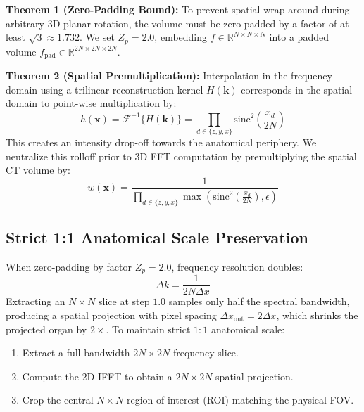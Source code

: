 \documentclass[journal,twocolumn]{IEEEtran}
\begin{document}
\textbf{Theorem 1 (Zero-Padding Bound):} To prevent spatial wrap-around during arbitrary 3D planar rotation, the volume must be zero-padded by a factor of at least $\sqrt{3} \approx 1.732$. We set $Z_p = 2.0$, embedding $f \in \mathbb{R}^{N \times N \times N}$ into a padded volume $f_{\mathrm{pad}} \in \mathbb{R}^{2N \times 2N \times 2N}$.

\textbf{Theorem 2 (Spatial Premultiplication):} Interpolation in the frequency domain using a trilinear reconstruction kernel $H(\mathbf{k})$ corresponds in the spatial domain to point-wise multiplication by:
\begin{equation}
h(\mathbf{x}) = \mathcal{F}^{-1}\{H(\mathbf{k})\} = \prod_{d \in \{z,y,x\}} \mathrm{sinc}^2\left(\frac{x_d}{2N}\right)
\end{equation}
This creates an intensity drop-off towards the anatomical periphery. We neutralize this rolloff prior to 3D FFT computation by premultiplying the spatial CT volume by:
\begin{equation}
w(\mathbf{x}) = \frac{1}{\prod_{d \in \{z,y,x\}} \max\left(\mathrm{sinc}^2\left(\frac{x_d}{2N}\right), \epsilon\right)}
\end{equation}

\subsection{Strict 1:1 Anatomical Scale Preservation}
When zero-padding by factor $Z_p = 2.0$, frequency resolution doubles:
\begin{equation}
\Delta k = \frac{1}{2N \Delta x}
\end{equation}
Extracting an $N \times N$ slice at step $1.0$ samples only half the spectral bandwidth, producing a spatial projection with pixel spacing $\Delta x_{\mathrm{out}} = 2 \Delta x$, which shrinks the projected organ by $2\times$. To maintain strict $1:1$ anatomical scale:
\begin{enumerate}
    \item Extract a full-bandwidth $2N \times 2N$ frequency slice.
    \item Compute the 2D IFFT to obtain a $2N \times 2N$ spatial projection.
    \item Crop the central $N \times N$ region of interest (ROI) matching the physical FOV.
\end{enumerate}
\end{document}
